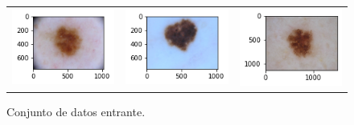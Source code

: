 \begin{figure}[!b]
\begin{tabular}{ccc}
        \includegraphics[width=4cm]{../Plots/THR/sample_12.png} &
        \includegraphics[width=4cm]{../Plots/THR/sample_13.png} &
        \includegraphics[width=4cm]{../Plots/THR/sample_14.png} \\

    \end{tabular}        
    \caption{Conjunto de datos entrante.}
    \label{fig:thresh_input}
\end{figure}


